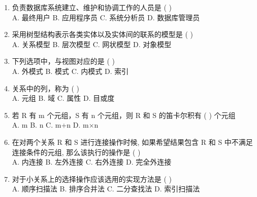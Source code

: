 \documentclass{ctexart} %
\begin{document}
\vspace{2em}

\begin{enumerate}[label=\arabic*.]
    \item 负责数据库系统建立、维护和协调工作的人员是 ( ) \\
    A. 最终用户 \quad B. 应用程序员 \quad C. 系统分析员 \quad D. 数据库管理员
    \item 采用树型结构表示各类实体以及实体间的联系的模型是 ( ) \\
    A. 关系模型 \quad B. 层次模型 \quad C. 网状模型 \quad D. 对象模型
    \item 下列选项中，与视图对应的是 ( ) \\
    A. 外模式 \quad B. 模式 \quad C. 内模式 \quad D. 索引
    \item 关系中的列，称为 ( ) \\
    A. 元组 \quad B. 域 \quad C. 属性 \quad D. 目或度
    \item 若 R 有 m 个元组，S 有 n 个元组，则 R 和 S 的笛卡尔积有 ( ) 个元组 \\
    A. m \quad B. n \quad C. m+n \quad D. m$\times$n
    \item 在对两个关系 R 和 S 进行连接操作时候, 如果希望结果包含 R 和 S 中不满足连接条件的元组, 那么该执行的操作是 ( ) \\
    A. 内连接 \quad B. 左外连接 \quad C. 右外连接 \quad D. 完全外连接
    \item 对于小关系上的选择操作应该选用的实现方法是 ( ) \\
    A. 顺序扫描法 \quad B. 排序合并法 \quad C. 二分查找法 \quad D. 索引扫描法
\end{enumerate}
\end{document}
